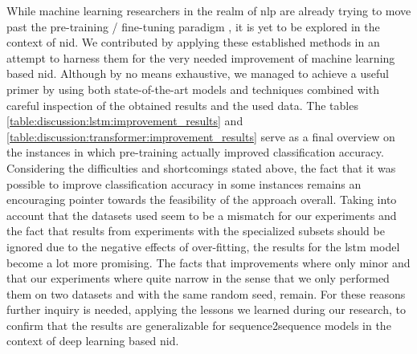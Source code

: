 While machine learning researchers in the realm of \gls{nlp} are already trying to move past the pre-training / fine-tuning paradigm \cite{gpt3}, it is yet to be explored in the context of \gls{nid}. We contributed by applying these established methods in an attempt to harness them for the very needed improvement of
machine learning based \gls{nid}. Although by no means exhaustive, we managed to achieve a useful primer by using both state-of-the-art models and techniques combined with careful inspection of the obtained results and the used data. The tables \ref{table:discussion:lstm:improvement_results} and \ref{table:discussion:transformer:improvement_results} serve as a final overview on the instances in which pre-training actually improved classification accuracy. Considering the difficulties and shortcomings stated above, the fact that it was possible to improve classification accuracy in some instances remains an encouraging pointer towards the feasibility of the approach overall. Taking into account that the datasets used seem to be a mismatch for our experiments and the fact that results from experiments with the specialized subsets should be ignored due to the negative effects of over-fitting, the results for the \gls{lstm} model become a lot more promising. 
The facts that improvements where only minor and that our experiments where quite narrow in the sense that we only performed them on two datasets and with the same random seed, remain. For these reasons further inquiry is needed, applying the lessons we learned during our research, to confirm that the results are generalizable for sequence2sequence models in the context of deep learning based \gls{nid}. \par

\newpage